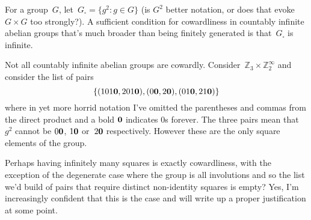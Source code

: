 \documentclass[a4paper,12pt]{article}
\newcommand{\Z}{\mathbb{Z}}
\newcommand{\R}{\mathbb{R}}
\begin{document}
For a group~$G$, let~$G_{\square} = \{ g^2 : g \in G \}$ (is $G^2$ better notation, or does that evoke~$G \times G$ too strongly?).  A sufficient condition for cowardliness in countably infinite abelian groups that's much broader than being finitely generated is that~$G_{\square}$ is infinite.

Not all countably infinite abelian groups are cowardly.  Consider~$\Z_3 \times \Z_2^{\infty}$ and consider the list of pairs
$$\{ (101{\bf 0}, 201{\bf 0}), (0{\bf 0}, 2{\bf 0}), (01{\bf 0},21{\bf 0})   \}$$ 
where in yet more horrid notation I've omitted the parentheses and commas from the direct product and a bold ${\bf 0}$ indicates 0s forever.  The three pairs mean that~$g^2$ cannot be $0{\bf 0}$, $1{\bf 0}$ or~$2{\bf 0}$ respectively.  However these are the only square elements of the group.

Perhaps having infinitely many squares is exactly cowardliness, with the exception of the degenerate case where the group is all involutions and so the list we'd build of pairs that require distinct non-identity squares is empty?  Yes, I'm increasingly confident that this is the case and will write up a proper justification at some point.


\end{document}
